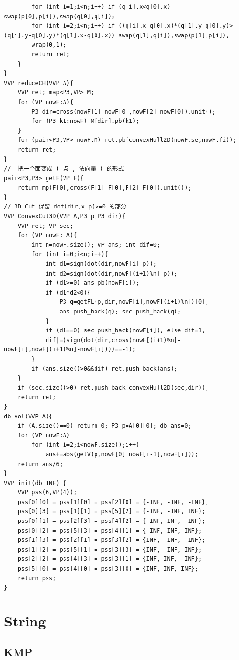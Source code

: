 \documentclass[twoside]{article}
\begin{document}
\begin{lstlisting}
        for (int i=1;i<n;i++) if (q[i].x<q[0].x) swap(p[0],p[i]),swap(q[0],q[i]);
        for (int i=2;i<n;i++) if ((q[i].x-q[0].x)*(q[1].y-q[0].y)>(q[i].y-q[0].y)*(q[1].x-q[0].x)) swap(q[1],q[i]),swap(p[1],p[i]);
        wrap(0,1);
        return ret;
    }
}
VVP reduceCH(VVP A){
    VVP ret; map<P3,VP> M;
    for (VP nowF:A){
        P3 dir=cross(nowF[1]-nowF[0],nowF[2]-nowF[0]).unit();
        for (P3 k1:nowF) M[dir].pb(k1);
    }
    for (pair<P3,VP> nowF:M) ret.pb(convexHull2D(nowF.se,nowF.fi));
    return ret;
}
//  把一个面变成 ( 点 , 法向量 ) 的形式
pair<P3,P3> getF(VP F){
    return mp(F[0],cross(F[1]-F[0],F[2]-F[0]).unit());
}
// 3D Cut 保留 dot(dir,x-p)>=0 的部分
VVP ConvexCut3D(VVP A,P3 p,P3 dir){
    VVP ret; VP sec;
    for (VP nowF: A){
        int n=nowF.size(); VP ans; int dif=0;
        for (int i=0;i<n;i++){
            int d1=sign(dot(dir,nowF[i]-p));
            int d2=sign(dot(dir,nowF[(i+1)%n]-p));
            if (d1>=0) ans.pb(nowF[i]);
            if (d1*d2<0){
                P3 q=getFL(p,dir,nowF[i],nowF[(i+1)%n])[0];
                ans.push_back(q); sec.push_back(q);
            }
            if (d1==0) sec.push_back(nowF[i]); else dif=1;
            dif|=(sign(dot(dir,cross(nowF[(i+1)%n]-nowF[i],nowF[(i+1)%n]-nowF[i])))==-1);
        }
        if (ans.size()>0&&dif) ret.push_back(ans);
    }
    if (sec.size()>0) ret.push_back(convexHull2D(sec,dir));
    return ret;
}
db vol(VVP A){
    if (A.size()==0) return 0; P3 p=A[0][0]; db ans=0;
    for (VP nowF:A)
        for (int i=2;i<nowF.size();i++)
            ans+=abs(getV(p,nowF[0],nowF[i-1],nowF[i]));
    return ans/6;
}
VVP init(db INF) {
    VVP pss(6,VP(4));
    pss[0][0] = pss[1][0] = pss[2][0] = {-INF, -INF, -INF};
    pss[0][3] = pss[1][1] = pss[5][2] = {-INF, -INF, INF};
    pss[0][1] = pss[2][3] = pss[4][2] = {-INF, INF, -INF};
    pss[0][2] = pss[5][3] = pss[4][1] = {-INF, INF, INF};
    pss[1][3] = pss[2][1] = pss[3][2] = {INF, -INF, -INF};
    pss[1][2] = pss[5][1] = pss[3][3] = {INF, -INF, INF};
    pss[2][2] = pss[4][3] = pss[3][1] = {INF, INF, -INF};
    pss[5][0] = pss[4][0] = pss[3][0] = {INF, INF, INF};
    return pss;
}
\end{lstlisting}
\clearpage\section{String}
\subsection{KMP}
\end{document}
